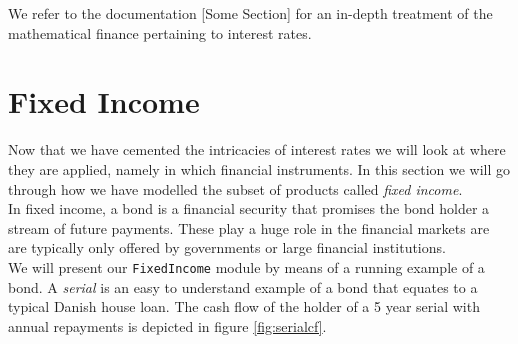 We refer to the documentation \cite{hqldoc}[Some Section] for an 
in-depth treatment of the mathematical finance pertaining to interest rates.

\section{Fixed Income}

Now that we have cemented the intricacies of interest rates we will look at 
where they are applied, namely in which financial instruments. In this section
we will go through how we have modelled the subset of products called 
\emph{fixed income}.\\

In fixed income, a bond is a financial security that promises the bond holder a
stream of future payments. These play a huge role in the financial markets are
are typically only offered by governments or large financial institutions.\\

We will present our \texttt{FixedIncome} module by means of a running example
of a bond. 
A \emph{serial} is an easy to understand example of a bond that equates to a 
typical Danish house loan. The cash flow of the holder of a 5 year serial with
annual repayments is depicted in figure \ref{fig:serialcf}.\\


